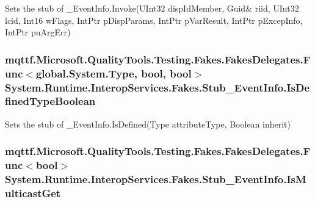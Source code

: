 Sets the stub of \-\_\-\-Event\-Info.\-Invoke(U\-Int32 disp\-Id\-Member, Guid\& riid, U\-Int32 lcid, Int16 w\-Flags, Int\-Ptr p\-Disp\-Params, Int\-Ptr p\-Var\-Result, Int\-Ptr p\-Excep\-Info, Int\-Ptr pu\-Arg\-Err)

\hypertarget{class_system_1_1_runtime_1_1_interop_services_1_1_fakes_1_1_stub___event_info_af2eacd26fbe91552db3f78c4cf419b15}{
\subsubsection[{Is\-Defined\-Type\-Boolean}]{\setlength{\rightskip}{0pt plus 5cm}mqttf.\-Microsoft.\-Quality\-Tools.\-Testing.\-Fakes.\-Fakes\-Delegates.\-Func$<$global.\-System.\-Type, bool, bool$>$ System.\-Runtime.\-Interop\-Services.\-Fakes.\-Stub\-\_\-\-Event\-Info.\-Is\-Defined\-Type\-Boolean}}\label{class_system_1_1_runtime_1_1_interop_services_1_1_fakes_1_1_stub___event_info_af2eacd26fbe91552db3f78c4cf419b15}


Sets the stub of \-\_\-\-Event\-Info.\-Is\-Defined(\-Type attribute\-Type, Boolean inherit)

\hypertarget{class_system_1_1_runtime_1_1_interop_services_1_1_fakes_1_1_stub___event_info_a887b97045dee09b9dc0bb400fa90212f}{
\subsubsection[{Is\-Multicast\-Get}]{\setlength{\rightskip}{0pt plus 5cm}mqttf.\-Microsoft.\-Quality\-Tools.\-Testing.\-Fakes.\-Fakes\-Delegates.\-Func$<$bool$>$ System.\-Runtime.\-Interop\-Services.\-Fakes.\-Stub\-\_\-\-Event\-Info.\-Is\-Multicast\-Get}}\label{class_system_1_1_runtime_1_1_interop_services_1_1_fakes_1_1_stub___event_info_a887b97045dee09b9dc0bb400fa90212f}



